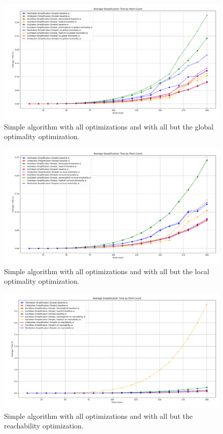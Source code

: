 \begin{figure}[b]
  \centering
	\includegraphics[scale=0.4]{./figures/simple-g.png}
  \caption{Simple algorithm with all optimizations and with all but the global optimality optimization.}
  \label{fig:simple-g}
\end{figure}

\begin{figure}[b]
  \centering
	\includegraphics[scale=0.4]{./figures/simple-l.png}
  \caption{Simple algorithm with all optimizations and with all but the local optimality optimization.}
  \label{fig:simple-l}
\end{figure}

\begin{figure}[b]
  \centering
	\includegraphics[scale=0.4]{./figures/simple-r.png}
  \caption{Simple algorithm with all optimizations and with all but the reachability optimization.}
  \label{fig:simple-r}
\end{figure}

